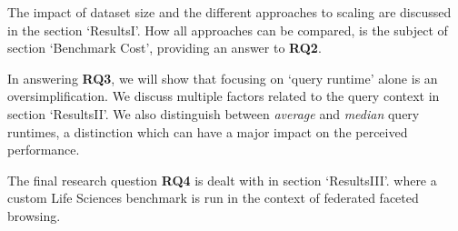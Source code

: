 The impact of dataset size and the different approaches to scaling are discussed in the section `ResultsI'.
How all approaches can be compared, is the subject of section `Benchmark Cost', %
providing an answer to \textbf{RQ2}. 

In answering \textbf{RQ3}, we will show that focusing on `query runtime' alone is an oversimplification. We discuss multiple factors related to the query context in section `ResultsII'. %
We also distinguish between \emph{average} and \emph{median} query runtimes, 
a distinction which can have a major impact on the perceived performance.

The final research question \textbf{RQ4} is dealt with in section `ResultsIII'. 
where a custom Life Sciences benchmark is run in the context of federated faceted browsing. 
